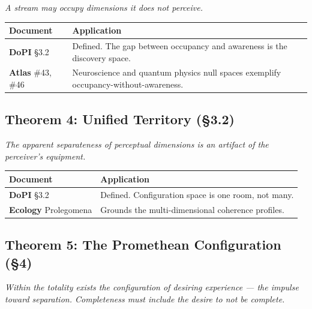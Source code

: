 \textit{A stream may occupy dimensions it does not perceive.}



\begin{longtable}{p{} p{}}
\toprule
\textbf{Document} & \textbf{Application} \\
\midrule
\endhead
\textbf{DoPI} §3.2 & Defined. The gap between occupancy and awareness is the discovery space. \\
\textbf{Atlas} \#43, \#46 & Neuroscience and quantum physics null spaces exemplify occupancy-without-awareness. \\
\bottomrule
\end{longtable}



\subsection*{Theorem 4: Unified Territory (§3.2)}


\textit{The apparent separateness of perceptual dimensions is an artifact of the perceiver's equipment.}



\begin{longtable}{p{} p{}}
\toprule
\textbf{Document} & \textbf{Application} \\
\midrule
\endhead
\textbf{DoPI} §3.2 & Defined. Configuration space is one room, not many. \\
\textbf{Ecology} Prolegomena & Grounds the multi-dimensional coherence profiles. \\
\bottomrule
\end{longtable}



\subsection*{Theorem 5: The Promethean Configuration (§4)}


\textit{Within the totality exists the configuration of desiring experience — the impulse toward separation. Completeness must include the desire to not be complete.}



